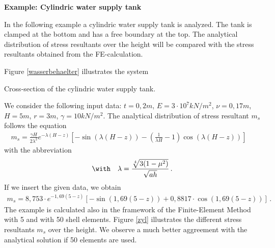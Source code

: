 \newpage
{\bf Example: Cylindric water supply tank}

In the following example a cylindric water supply tank is 
analyzed. 
The tank is clamped at the bottom and has a free boundary 
at the top. 
The analytical distribution of stress resultants over the height 
will be compared with the stress resultants obtained 
from the FE-calculation. 

Figure \ref{wasserbehaelter} illustrates the system

\begin{Figure}[htb]
\begin{center}

\setlength{\baselineskip}{11pt}
\caption{Cross-section of the cylindric water supply tank.}
\label{wasserbehaelter}
\end{center}
\end{Figure}%

We consider the following input data:
$t = 0,2 m$, $E = 3 \cdot 10^7 kN / m^2$, $\nu = 0,17 m$, $H = 5 m$,
$r = 3 m$, $\gamma = 10 kN / m^2$.
The analytical distribution of stress resultant $m_s$ follows 
the equation 
\begin{eqnarray*}
m_s = \frac{\gamma H}{2 \lambda^2} e^{- \lambda (H - z)} 
\left[ - \sin (\lambda (H - z)) - \left( \frac{1}{\lambda H} - 1  \right)
\cos (\lambda (H - z))\right] \quad 
\end{eqnarray*}
with the abbreviation 
\begin{eqnarray*}
\with \quad \lambda = \frac{\sqrt[4]{3 (1 - \mu^2)}}{\sqrt{a h}} \, .
\end{eqnarray*}
If we insert the given data, we obtain 
\begin{eqnarray*}
m_s = 8,753 \cdot e^{- 1,69 (5 - z)} 
\left[ - \sin (1,69 (5 - z)) + 0,8817 \cdot 
\cos (1,69 (5 - z))\right] \, .
\end{eqnarray*}
The example is calculated also in the framework of the 
Finite-Element Method with 5 and with 50 shell elements. 
Figure \ref{zyl} illustrates the different stress resultants 
$m_s$ over the height. 
We observe a much better aggreement with the analytical 
solution if 50 elements are used. 

